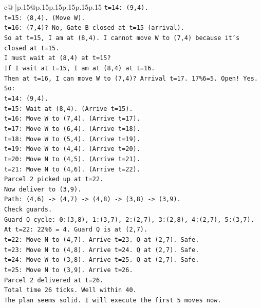 \documentclass{article}
\begin{document}
{\begin{supertabular}{c@{$\;$}|p{.15\linewidth}@{}p{.15\linewidth}p{.15\linewidth}p{.15\linewidth}p{.15\linewidth}p{.15\linewidth}}
{{{\texttt{t=14: (9,4).} \\
\texttt{t=15: (8,4). (Move W).} \\
\texttt{t=16: (7,4)? No, Gate B closed at t=15 (arrival).} \\
\texttt{So at t=15, I am at (8,4). I cannot move W to (7,4) because it's closed at t=15.} \\
\texttt{I must wait at (8,4) at t=15?} \\
\texttt{If I wait at t=15, I am at (8,4) at t=16.} \\
\texttt{Then at t=16, I can move W to (7,4)? Arrival t=17. 17\%6=5. Open! Yes.} \\
\texttt{So:} \\
\texttt{t=14: (9,4).} \\
\texttt{t=15: Wait at (8,4). (Arrive t=15).} \\
\texttt{t=16: Move W to (7,4). (Arrive t=17).} \\
\texttt{t=17: Move W to (6,4). (Arrive t=18).} \\
\texttt{t=18: Move W to (5,4). (Arrive t=19).} \\
\texttt{t=19: Move W to (4,4). (Arrive t=20).} \\
\texttt{t=20: Move N to (4,5). (Arrive t=21).} \\
\texttt{t=21: Move N to (4,6). (Arrive t=22).} \\
\texttt{Parcel 2 picked up at t=22.} \\
\texttt{Now deliver to (3,9).} \\
\texttt{Path: (4,6) {-}> (4,7) {-}> (4,8) {-}> (3,8) {-}> (3,9).} \\
\texttt{Check guards.} \\
\texttt{Guard Q cycle: 0:(3,8), 1:(3,7), 2:(2,7), 3:(2,8), 4:(2,7), 5:(3,7).} \\
\texttt{At t=22: 22\%6 = 4. Guard Q is at (2,7).} \\
\texttt{t=22: Move N to (4,7). Arrive t=23. Q at (2,7). Safe.} \\
\texttt{t=23: Move N to (4,8). Arrive t=24. Q at (2,7). Safe.} \\
\texttt{t=24: Move W to (3,8). Arrive t=25. Q at (2,7). Safe.} \\
\texttt{t=25: Move N to (3,9). Arrive t=26.} \\
\texttt{Parcel 2 delivered at t=26.} \\
\texttt{Total time 26 ticks. Well within 40.} \\
\texttt{The plan seems solid. I will execute the first 5 moves now.} \\
}}}
\end{supertabular}}
\end{document}
